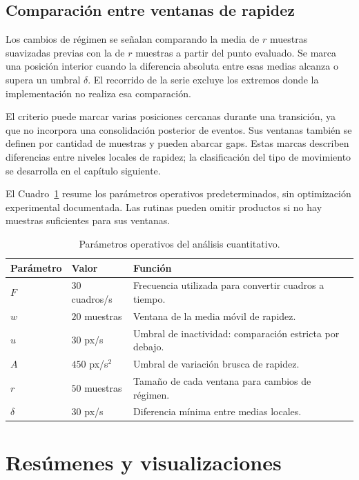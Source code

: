 \subsection{Comparación entre ventanas de rapidez}

Los cambios de régimen se señalan comparando la media de $r$ muestras suavizadas previas con la de $r$ muestras a partir del punto evaluado. Se marca una posición interior cuando la diferencia absoluta entre esas medias alcanza o supera un umbral $\delta$. El recorrido de la serie excluye los extremos donde la implementación no realiza esa comparación.

El criterio puede marcar varias posiciones cercanas durante una transición, ya que no incorpora una consolidación posterior de eventos. Sus ventanas también se definen por cantidad de muestras y pueden abarcar gaps. Estas marcas describen diferencias entre niveles locales de rapidez; la clasificación del tipo de movimiento se desarrolla en el capítulo siguiente.

El Cuadro~\ref{tab:parametros-analisis-trayectorias} resume los parámetros operativos predeterminados, sin optimización experimental documentada. Las rutinas pueden omitir productos si no hay muestras suficientes para sus ventanas.

\begin{table}[htbp]
  \centering
  \small
  \caption{Parámetros operativos del análisis cuantitativo.}
  \label{tab:parametros-analisis-trayectorias}
  \begin{tabularx}{\textwidth}{@{}l l X@{}}
    \toprule
    Parámetro & Valor & Función \\
    \midrule
    $F$ & $30$ cuadros/s & Frecuencia utilizada para convertir cuadros a tiempo. \\
    $w$ & $20$ muestras & Ventana de la media móvil de rapidez. \\
    $u$ & $30$ px/s & Umbral de inactividad: comparación estricta por debajo. \\
    $A$ & $450$ px/s$^2$ & Umbral de variación brusca de rapidez. \\
    $r$ & $50$ muestras & Tamaño de cada ventana para cambios de régimen. \\
    $\delta$ & $30$ px/s & Diferencia mínima entre medias locales. \\
    \bottomrule
  \end{tabularx}
\end{table}

\section{Resúmenes y visualizaciones}

